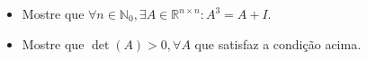 \begin{itemize}
\item[(a)] Mostre que \(\forall n \in \mathbb{N}_0, \exists A \in \mathbb{R}^{n\times n}: A^3=A+I\).
\item[(b)] Mostre que \(\det(A)>0, \forall A\) que satisfaz a condição acima.
\end{itemize}
